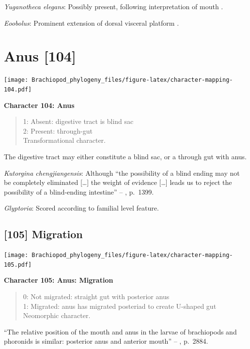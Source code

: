 \documentclass[openany]{book}
\theoremstyle{definition}
\theoremstyle{definition}
\theoremstyle{definition}
\theoremstyle{remark}
\begin{document}
\emph{Yuganotheca elegans}: Possibly present, following interpretation
of mouth \citep[see fig. 2c, d in][]{Zhang2014Anearly}.

\emph{Eoobolus}: Prominent extension of dorsal visceral platform
\citep{Balthasar2009Thebrachiopod}.

\hypertarget{anus-104}{%
\section{Anus {[}104{]}}\label{anus-104}}

\texttt{[image: Brachiopod\_phylogeny\_files/figure-latex/character-mapping-104.pdf]}

\textbf{Character 104: Anus}

\begin{quote}
1: Absent: digestive tract is blind sac\\
2: Present: through-gut\\
Transformational character.
\end{quote}

The digestive tract may either constitute a blind sac, or a through gut
with anus.

\emph{Kutorgina chengjiangensis}: Although ``the possibility of a blind
ending may not be completely eliminated {[}\ldots{}{]} the weight of
evidence {[}\ldots{}{]} leads us to reject the possibility of a
blind-ending intestine'' --
\citet{Zhang2007Rhynchonelliformeanbrachiopods}, p.~1399.

\emph{Glyptoria}: Scored according to familial level feature.

\hypertarget{migration}{%
\subsection*{{[}105{]} Migration}\label{migration}}

\texttt{[image: Brachiopod\_phylogeny\_files/figure-latex/character-mapping-105.pdf]}

\textbf{Character 105: Anus: Migration}

\begin{quote}
0: Not migrated: straight gut with posterior anus\\
1: Migrated: anus has migrated posteriad to create U-shaped gut\\
Neomorphic character.
\end{quote}

``The relative position of the mouth and anus in the larvae of
brachiopods and phoronids is similar: posterior anus and anterior
mouth'' -- \citet{Williams2007PartH}, p.~2884.
\end{document}

